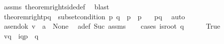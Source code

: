 \begin{isabellebody}
\ assms{\isacharparenleft}{\kern0pt}{}{\isacharparenright}{\kern0pt}\ theorem{\isacharunderscore}{\kern0pt}rightside{\isacharunderscore}{\kern0pt}def\ \isamarkupfalse%
\ blast\isanewline
\ \ \isamarkupfalse%
\ \isamarkupfalse%
\ theorem{\isacharunderscore}{\kern0pt}right{\isacharunderscore}{\kern0pt}pq{\isacharcolon}{\kern0pt}\ \ {\isachardoublequoteopen}{\isacharparenleft}{\kern0pt}{\isacharparenleft}{\kern0pt}subset{\isacharunderscore}{\kern0pt}condition\ p\ q{\isacharparenright}{\kern0pt}\ {\isasymand}\ {\isacharparenleft}{\kern0pt}{\isacharparenleft}{\kern0pt}{\isasymL}\isactrlsup {\isacharasterisk}{\kern0pt}{\isacharparenleft}{\kern0pt}p{\isacharparenright}{\kern0pt}{\isacharparenright}{\kern0pt}\ {\isacharequal}{\kern0pt}\ {\isacharparenleft}{\kern0pt}{\isasymL}\isactrlsup {\isacharasterisk}{\kern0pt}\isactrlsub {\isasymsqunion}\isactrlsub {\isasymsqunion}{\isacharparenleft}{\kern0pt}p{\isacharparenright}{\kern0pt}{\isacharparenright}{\kern0pt}{\isacharparenright}{\kern0pt}{\isacharparenright}{\kern0pt}{\isachardoublequoteclose}\ \ \isamarkupfalse%
\ pq\ \isamarkupfalse%
\ auto\isanewline
\ \ \ \ \ \ \isanewline
\ \ \isamarkupfalse%
\ \isamarkupfalse%
\ a{\isacharunderscore}{\kern0pt}send{\isacharunderscore}{\kern0pt}ok{\isacharcolon}{\kern0pt}\ {\isachardoublequoteopen}{\isacharparenleft}{\kern0pt}{\isacharquery}{\kern0pt}v{\isacharprime}{\kern0pt}\ {\isasymsqdot}\ {\isacharbrackleft}{\kern0pt}a{\isacharbrackright}{\kern0pt}{\isacharparenright}{\kern0pt}\ {\isasymin}\ {\isasymT}\isactrlbsub None\isactrlesub {\isachardoublequoteclose}\ \isamarkupfalse%
\ a{\isacharunderscore}{\kern0pt}def\ Suc\ assms\isanewline
\ \ \isamarkupfalse%
\ {\isacharparenleft}{\kern0pt}cases\ {\isachardoublequoteopen}is{\isacharunderscore}{\kern0pt}root\ q{\isachardoublequoteclose}{\isacharparenright}{\kern0pt}\isanewline
\ \ \ \ \isamarkupfalse%
\ True\isanewline
\ \ \ \ \isamarkupfalse%
\ \isamarkupfalse%
\ {\isachardoublequoteopen}{\isacharparenleft}{\kern0pt}v{\isasymdown}\isactrlsub q\ {\isasymsqdot}\ {\isacharbrackleft}{\kern0pt}{\isacharbang}{\kern0pt}{\isasymlangle}{\isacharparenleft}{\kern0pt}i\isactrlbsup q{\isasymrightarrow}p\isactrlesup {\isacharparenright}{\kern0pt}{\isasymrangle}{\isacharbrackright}{\kern0pt}{\isacharparenright}{\kern0pt}\ {\isasymin}\ {\isacharparenleft}{\kern0pt}{\isasymL}\isactrlsup {\isacharasterisk}{\kern0pt}{\isacharparenleft}{\kern0pt}q{\isacharparenright}{\kern0pt}{\isacharparenright}{\kern0pt}{\isachardoublequoteclose}\ \isamarkupfalse%

\end{isabellebody}
